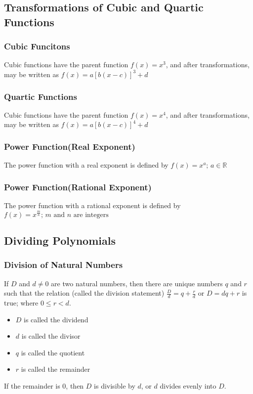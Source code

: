 \documentclass{article}
\begin{document}
	\subsection{Transformations of Cubic and Quartic Functions}
	\subsubsection{Cubic Funcitons}
	Cubic functions have the parent function $f(x)=x^3$, and after transformations, may be written as $f(x)=a[b(x-c)]^3+d$
	\subsubsection{Quartic Functions}
	Cubic functions have the parent function $f(x)=x^4$, and after transformations, may be written as $f(x)=a[b(x-c)]^4+d$
	\subsubsection{Power Function(Real Exponent)}
	The power function with a real exponent is defined by $f(x)=x^a\text{; }a\in\mathbb{R}$
	\subsubsection{Power Function(Rational Exponent)}
	The power function with a rational exponent is defined by $f(x)=x^\frac{m}{n}\text{; }m\text{ and }n\text{ are integers}$
	\subsection{Dividing Polynomials}
	\subsubsection{Division of Natural Numbers}
	If $D$ and $d\neq0$ are two natural numbers, then there are unique numbers $q$ and $r$ such that the relation (called the division statement) $\frac{D}{d}=q+\frac{r}{d}$ or $D=dq+r$ is true; where $0\leq r<d$.
	\begin{itemize}
		\item $D$ is called the dividend
		\item $d$ is called the divisor
		\item $q$ is called the quotient
		\item $r$ is called the remainder
	\end{itemize}
	If the remainder is 0, then $D$ is divisible by $d$, or $d$ divides evenly into $D$.
\end{document}
